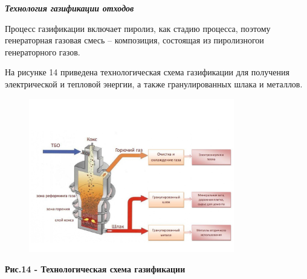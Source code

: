 
\emph{{\bfseries Технология газификации отходов}}

Процесс газификации включает пиролиз, как стадию процесса, поэтому
генераторная газовая смесь -- композиция, состоящая из пиролизногои
генераторного газов.

На рисунке 14 приведена технологическая схема газификации для получения
электрической и тепловой энергии, а также гранулированных шлака и
металлов.


\begin{figure}[H]
	\centering
	\includegraphics[width=0.8\textwidth]{media/chem2/image77}
	\caption*{}
\end{figure}


{\bfseries Рис.14 - Технологическая схема газификации}

